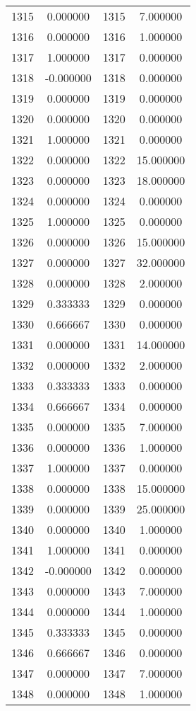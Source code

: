 \documentclass[12pt]{article}
\begin{document}
\begin{longtable}{@{}cccc@{}}
1315 & 0.000000 & 1315 & 7.000000 \\
1316 & 0.000000 & 1316 & 1.000000 \\
1317 & 1.000000 & 1317 & 0.000000 \\
1318 & -0.000000 & 1318 & 0.000000 \\
1319 & 0.000000 & 1319 & 0.000000 \\
1320 & 0.000000 & 1320 & 0.000000 \\
1321 & 1.000000 & 1321 & 0.000000 \\
1322 & 0.000000 & 1322 & 15.000000 \\
1323 & 0.000000 & 1323 & 18.000000 \\
1324 & 0.000000 & 1324 & 0.000000 \\
1325 & 1.000000 & 1325 & 0.000000 \\
1326 & 0.000000 & 1326 & 15.000000 \\
1327 & 0.000000 & 1327 & 32.000000 \\
1328 & 0.000000 & 1328 & 2.000000 \\
1329 & 0.333333 & 1329 & 0.000000 \\
1330 & 0.666667 & 1330 & 0.000000 \\
1331 & 0.000000 & 1331 & 14.000000 \\
1332 & 0.000000 & 1332 & 2.000000 \\
1333 & 0.333333 & 1333 & 0.000000 \\
1334 & 0.666667 & 1334 & 0.000000 \\
1335 & 0.000000 & 1335 & 7.000000 \\
1336 & 0.000000 & 1336 & 1.000000 \\
1337 & 1.000000 & 1337 & 0.000000 \\
1338 & 0.000000 & 1338 & 15.000000 \\
1339 & 0.000000 & 1339 & 25.000000 \\
1340 & 0.000000 & 1340 & 1.000000 \\
1341 & 1.000000 & 1341 & 0.000000 \\
1342 & -0.000000 & 1342 & 0.000000 \\
1343 & 0.000000 & 1343 & 7.000000 \\
1344 & 0.000000 & 1344 & 1.000000 \\
1345 & 0.333333 & 1345 & 0.000000 \\
1346 & 0.666667 & 1346 & 0.000000 \\
1347 & 0.000000 & 1347 & 7.000000 \\
1348 & 0.000000 & 1348 & 1.000000 \\

\end{longtable}
\end{document}
